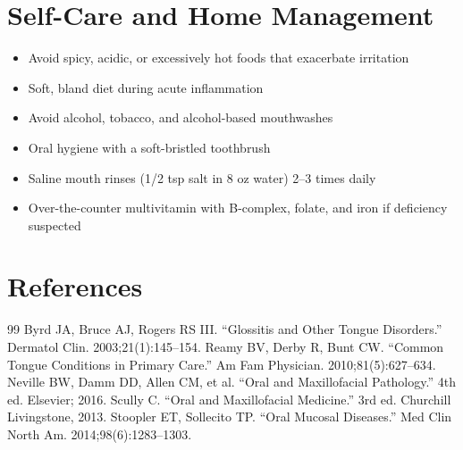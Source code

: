 \section*{Self-Care and Home Management}
\begin{itemize}
  \item Avoid spicy, acidic, or excessively hot foods that exacerbate irritation
  \item Soft, bland diet during acute inflammation
  \item Avoid alcohol, tobacco, and alcohol-based mouthwashes
  \item Oral hygiene with a soft-bristled toothbrush
  \item Saline mouth rinses (1/2 tsp salt in 8 oz water) 2--3 times daily
  \item Over-the-counter multivitamin with B-complex, folate, and iron if deficiency suspected
\end{itemize}

\section*{References}
\begin{thebibliography}{99}
 Byrd JA, Bruce AJ, Rogers RS III. ``Glossitis and Other Tongue Disorders.'' Dermatol Clin. 2003;21(1):145--154.
 Reamy BV, Derby R, Bunt CW. ``Common Tongue Conditions in Primary Care.'' Am Fam Physician. 2010;81(5):627--634.
 Neville BW, Damm DD, Allen CM, et al. ``Oral and Maxillofacial Pathology.'' 4th ed. Elsevier; 2016.
 Scully C. ``Oral and Maxillofacial Medicine.'' 3rd ed. Churchill Livingstone, 2013.
 Stoopler ET, Sollecito TP. ``Oral Mucosal Diseases.'' Med Clin North Am. 2014;98(6):1283--1303.
\end{thebibliography}
